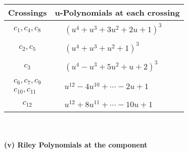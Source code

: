 \documentclass[1p]{elsarticle_modified}
\theoremstyle{definition}
\begin{document}
\begin{tabular}{m{50pt}|m{274pt}}
Crossings & \hspace{64pt}u-Polynomials at each crossing \\
\hline $$\begin{aligned}c_{1},c_{4},c_{8}\end{aligned}$$&$\begin{aligned}
&(u^4+u^3+3 u^2+2 u+1)^3
\end{aligned}$\\
\hline $$\begin{aligned}c_{2},c_{5}\end{aligned}$$&$\begin{aligned}
&(u^4+u^3+u^2+1)^3
\end{aligned}$\\
\hline $$\begin{aligned}c_{3}\end{aligned}$$&$\begin{aligned}
&(u^4- u^3+5 u^2+u+2)^3
\end{aligned}$\\
\hline $$\begin{aligned}c_{6},c_{7},c_{9}\\c_{10},c_{11}\end{aligned}$$&$\begin{aligned}
&u^{12}-4 u^{10}+\cdots-2 u+1
\end{aligned}$\\
\hline $$\begin{aligned}c_{12}\end{aligned}$$&$\begin{aligned}
&u^{12}+8 u^{11}+\cdots-10 u+1
\end{aligned}$\\
\hline
\end{tabular}\\~\\
\newpage\renewcommand{\arraystretch}{1}
\flushleft \textbf{(v) Riley Polynomials at the component}\newline \\
\end{document}
